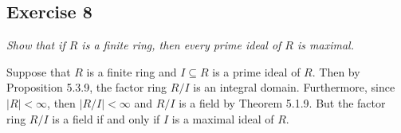 \subsection*{Exercise 8}
\textit{Show that if $R$ is a finite ring, then every prime ideal of $R$ is maximal.}

\vspace{5 mm}
Suppose that $R$ is a finite ring and $I \subseteq R$ is a prime ideal of $R$. Then by Proposition 5.3.9, the factor ring $R/I$ is an integral domain. Furthermore, since $|R| < \infty$, then $|R/I| < \infty$ and $R/I$ is a field by Theorem 5.1.9. But the factor ring $R/I$ is a field if and only if $I$ is a maximal ideal of $R$.